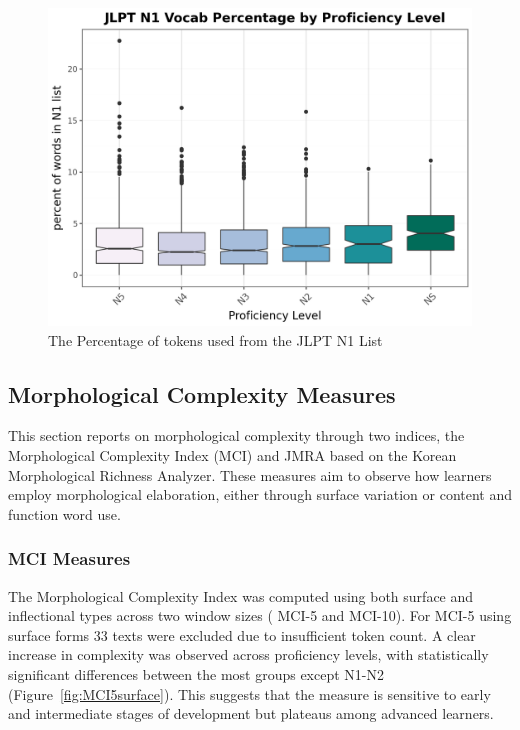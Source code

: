 \begin{figure}
           \centering
           \includegraphics[scale=.5]{img/LFP/JLPT_N1}
           \caption[Percentage of tokens used from the JLPT N1 List]{The Percentage of tokens used from the JLPT N1 List}
           \label{fig:JLPTN1vocab}
\end{figure}


\subsection{Morphological Complexity Measures}
This section reports on morphological complexity through two indices, the Morphological Complexity Index (MCI)
\citep{Brezina2019} and JMRA based on the Korean Morphological Richness Analyzer\citep{Hwang2024}. These
measures aim to observe how learners employ morphological elaboration, either through surface variation or content
and function word use.

\subsubsection{MCI Measures}


The Morphological Complexity Index was computed using both surface and inflectional types across two window sizes (
MCI-5 and MCI-10). For MCI-5 using surface forms 33 texts were excluded due to insufficient token count. A clear
increase in complexity was observed across proficiency levels, with statistically significant differences between
the most groups except N1-N2 (Figure~\ref{fig:MCI5surface}). This suggests that the measure is sensitive to early and
intermediate stages of
development
but plateaus among advanced learners.


